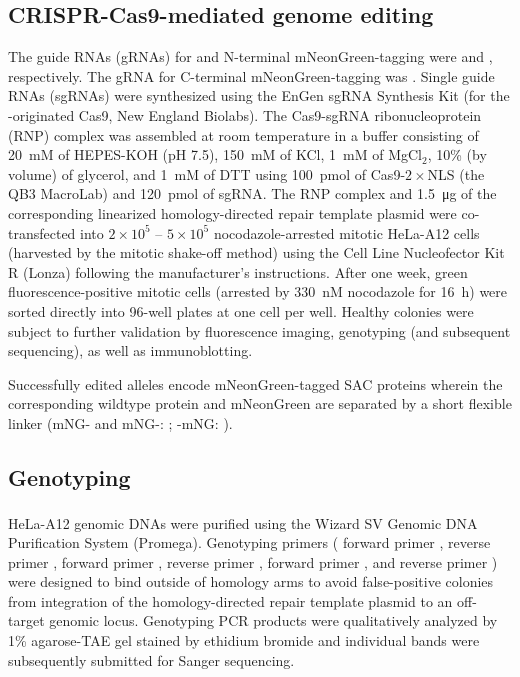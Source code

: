 \subsection{CRISPR-Cas9-mediated genome editing}
\label{CRISPRMethods}
The guide RNAs (gRNAs) for   and  N-terminal mNeonGreen-tagging were  and ,
respectively. The gRNA for   C-terminal mNeonGreen-tagging was . Single guide RNAs (sgRNAs) were synthesized using the EnGen sgRNA Synthesis Kit (for the -originated Cas9, New England Biolabs). The Cas9-sgRNA ribonucleoprotein (RNP) complex was assembled at room temperature in a buffer consisting of \SI{20}{mM} of HEPES-KOH (pH 7.5), \SI{150}{mM} of KCl, \SI{1}{mM} of MgCl$_2$, 10\% (by volume) of glycerol, and \SI{1}{mM} of DTT using \SI{100}{pmol} of Cas9-$2\times$NLS (the QB3 MacroLab) and \SI{120}{pmol} of sgRNA. The RNP complex and \SI{1.5}{\micro g} of the corresponding linearized homology-directed repair template plasmid were co-transfected into $2\times 10^5$ -- $5\times 10^5$ nocodazole-arrested mitotic HeLa-A12 cells \cite{CRISPRProtocol} (harvested by the mitotic shake-off method) using the Cell Line Nucleofector\texttrademark{} Kit R (Lonza) following the manufacturer's instructions. After one week, green fluorescence-positive mitotic cells (arrested by \SI{330}{nM} nocodazole for \SI{16}{h}) were sorted directly into 96-well plates at one cell per well. Healthy colonies were subject to further validation by fluorescence imaging, genotyping (and subsequent sequencing), as well as immunoblotting.

Successfully edited alleles encode mNeonGreen-tagged SAC proteins wherein the corresponding wildtype protein and mNeonGreen are separated by a short flexible linker (mNG- and mNG-: ; -mNG: ).

\subsection{Genotyping}
HeLa-A12 genomic DNAs were purified using the Wizard\textsuperscript{\textregistered} SV Genomic DNA Purification System (Promega). Genotyping primers ( forward primer ,
 reverse primer ,
 forward primer ,
 reverse primer ,
 forward primer ,
and  reverse primer )
were designed to bind outside of homology arms to avoid false-positive colonies from integration of the homology-directed repair template plasmid to an off-target genomic locus. Genotyping PCR products were qualitatively analyzed by 1\% agarose-TAE gel stained by ethidium bromide and individual bands were subsequently submitted for Sanger sequencing.

